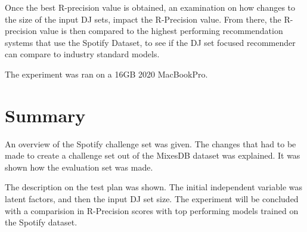Once the best R-precision value is obtained, an examination on how changes to the size of the input DJ sets, impact the R-Precision value. From there, the R-precision value is then compared to the highest performing recommendation systems that use the Spotify Dataset, to see if the DJ set focused recommender can compare to industry standard models.

The experiment was ran on a 16GB 2020 MacBookPro.

\section{Summary}
An overview of the Spotify challenge set was given. The changes that had to be made to create a challenge set out of the MixesDB dataset was explained. It was  shown how the evaluation set was made. 

The description on the test plan was shown. The initial independent variable was latent factors, and then the input DJ set size. The experiment will be concluded with a comparision in R-Precision scores with top performing models trained on the Spotify dataset.

